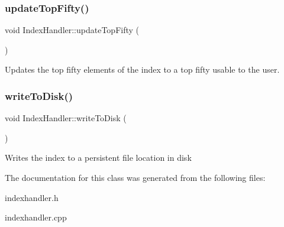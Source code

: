 \subsubsection{\texorpdfstring{update\+Top\+Fifty()}{updateTopFifty()}}
{\footnotesize\ttfamily void Index\+Handler\+::update\+Top\+Fifty (\begin{DoxyParamCaption}{ }\end{DoxyParamCaption})}

Updates the top fifty elements of the index to a top fifty usable to the user. \mbox{\label{classIndexHandler_a3f0c13dfe129c5a3b02d16b2aa6f1e0f}} 
\subsubsection{\texorpdfstring{write\+To\+Disk()}{writeToDisk()}}
{\footnotesize\ttfamily void Index\+Handler\+::write\+To\+Disk (\begin{DoxyParamCaption}{ }\end{DoxyParamCaption})}

Writes the index to a persistent file location in disk 

The documentation for this class was generated from the following files\+:\begin{DoxyCompactItemize}
\item 
indexhandler.\+h\item 
indexhandler.\+cpp\end{DoxyCompactItemize}
